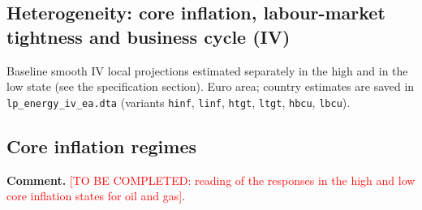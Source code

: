 \documentclass[11pt,a4paper]{article}
\newcommand{\tbc}[1]{\textcolor{red}{[TO BE COMPLETED: #1]}}
\begin{document}
\begin{appendices}
\clearpage

\section{Heterogeneity: core inflation, labour-market tightness and business cycle (IV)}\label{app:het}

\noindent Baseline smooth IV local projections estimated separately in the high and in the low state (see the specification section). Euro area; country estimates are saved in \texttt{lp\_energy\_iv\_ea.dta} (variants \texttt{hinf}, \texttt{linf}, \texttt{htgt}, \texttt{ltgt}, \texttt{hbcu}, \texttt{lbcu}).

\subsection{Core inflation regimes}

\noindent\textbf{Comment.} \tbc{reading of the responses in the high and low core inflation states for oil and gas}.


\end{appendices}
\end{document}
